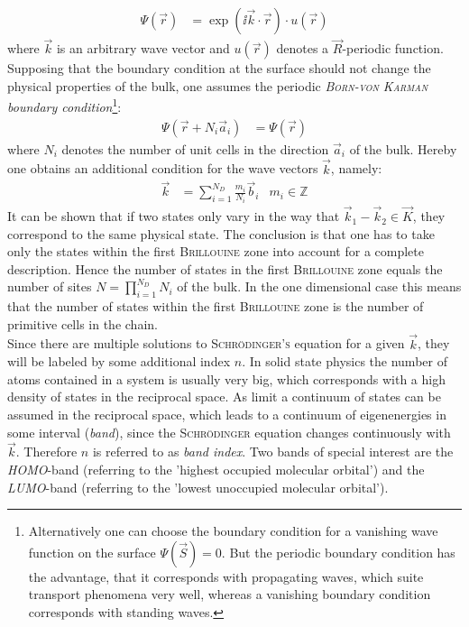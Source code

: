 \begin{align}
	\Psi(\vec{r}) &= \exp\left(\ii\vec{k}\cdot\vec{r}\right) \cdot u\left(\vec{r}\right)
\end{align}
where $\vec{k}$ is an arbitrary wave vector and $u\left(\vec{r}\right)$ denotes a $\vec{R}$-periodic function.\\
Supposing that the boundary condition at the surface should not change the physical properties of the bulk, one assumes the periodic \emph{\textsc{Born-von Karman} boundary condition}\footnote{Alternatively one can choose the boundary condition  for a vanishing wave function on the surface $\Psi\left(\vec{S}\right) = 0$. But the periodic boundary condition has the advantage, that it corresponds with propagating waves, which suite transport phenomena very well, whereas a vanishing boundary condition corresponds with standing waves.}:
\begin{align}
	\Psi\left(\vec{r} + N_i \vec{a}_i\right) &= \Psi\left(\vec{r}\right)
\end{align}
where $N_i$ denotes the number of unit cells in the direction $\vec{a}_i$ of the bulk. Hereby one obtains an additional condition for the wave vectors $\vec{k}$, namely:
\begin{align}
	\vec{k} &= \sum_{i = 1}^{N_D} \frac{m_i}{N_i} \vec{b}_i & m_i \in \mathbb{Z} 
\end{align}
It can be shown that if two states only vary in the way that $\vec{k}_1 - \vec{k}_2 \in \vec{K}$, they correspond to the same physical state. The conclusion is that one has to take only the states within the first \textsc{Brillouine} zone into account for a complete description. Hence the number of states in the first \textsc{Brillouine} zone equals the number of sites $N = \prod_{i = 1}^{N_D}N_i$ of the bulk. In the one dimensional case this means that the number of states within the first \textsc{Brillouine} zone is the number of primitive cells in the chain.\\
Since there are multiple solutions to \textsc{Schrödinger's} equation for a given $\vec{k}$, they will be labeled by some additional index $n$. In solid state physics the number of atoms contained in a system is usually very big, which corresponds with a high density of states in the reciprocal space. As limit a continuum of states can be assumed in the reciprocal space, which leads to a continuum of eigenenergies in some interval (\emph{band}), since the \textsc{Schrödinger} equation changes continuously with $\vec{k}$. Therefore $n$ is referred to as \emph{band index}. Two bands of special interest are the \emph{HOMO}-band (referring to the 'highest occupied molecular orbital') and the \emph{LUMO}-band (referring to the 'lowest unoccupied molecular orbital').


